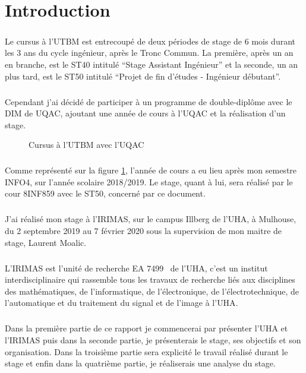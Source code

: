 \documentclass[a4paper,11pt,twoside,french,report]{../common/simplem}
\begin{document}
	\chapter*{Introduction}
		\paragraph*{}
			Le cursus à l'\gls{UTBM} est entrecoupé de deux périodes de stage de 6 mois durant les 3 ans du cycle ingénieur, après le Tronc Commun. La première, après un an en branche, est le ST40 intitulé ``Stage Assistant Ingénieur'' et la seconde, un an plus tard, est le ST50 intitulé ``Projet de fin d'études - Ingénieur débutant''.
		\paragraph*{}
			Cependant j'ai décidé de participer à un programme de double-diplôme avec le \gls{DIM} de \gls{UQAC}, ajoutant une année de cours à l'\gls{UQAC} et la réalisation d'un stage.
			\begin{figure}[H]
				\centering%
				\caption{Cursus à l'\acrshort{UTBM} avec l'\acrshort{UQAC}}%
				\label{fig:cursus_utbm_uqac}%
			\end{figure}
		\paragraph*{}
			Comme représenté sur la figure \ref{fig:cursus_utbm_uqac}, l'année de cours a eu lieu après mon semestre INFO4, sur l'année scolaire 2018/2019. Le stage, quant à lui, sera réalisé par le cour \gls{8INF859} avec le \gls{ST50}, concerné par ce document.
		\paragraph*{}
			J'ai réalisé mon stage à l'\gls{IRIMAS}, sur le campus Illberg de l'\gls{UHA}, à Mulhouse, du 2 septembre 2019 au 7 février 2020 sous la supervision de mon maitre de stage, Laurent Moalic.
		\paragraph*{}
			L'\gls{IRIMAS} est l'unité de recherche EA 7499~\cite{RNSR_IRIMAS} de l'\gls{UHA}, c'est un institut interdisciplinaire qui rassemble tous les travaux de recherche liés aux disciplines des mathématiques, de l'informatique, de l'électronique, de l'électrotechnique, de l'automatique et du traitement du signal et de l'image à l'\gls{UHA}.
		\paragraph*{}
			Dans la première partie de ce rapport je commencerai par présenter l'\gls{UHA} et l'\gls{IRIMAS} puis dans la seconde partie, je présenterais le stage, ses objectifs et son organisation. Dans la troisième partie sera explicité le travail réalisé durant le stage et enfin dans la quatrième partie, je réaliserais une analyse du stage.
	\makeutbmbackcover{}
\end{document}
